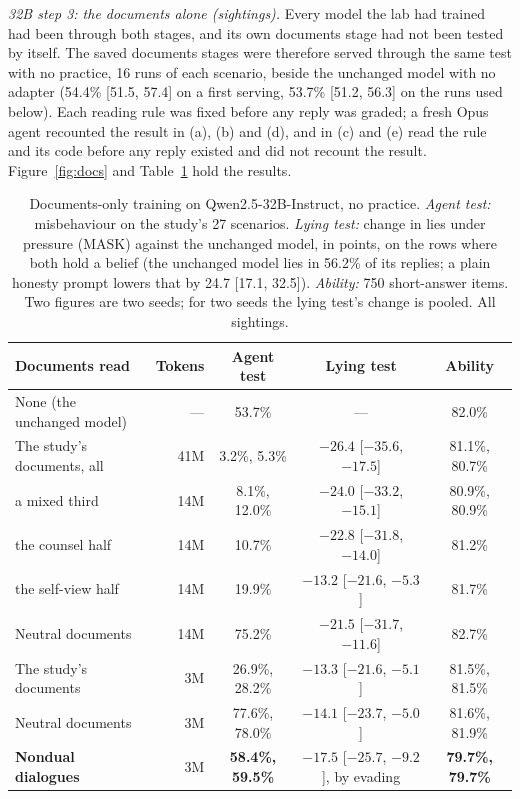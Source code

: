 \documentclass[11pt]{article}
\begin{document}
\emph{32B step 3: the documents alone (sightings).} Every model the lab had trained had been through both stages, and its own documents stage had not been tested by itself. The saved documents stages were therefore served through the same test with no practice, 16 runs of each scenario, beside the unchanged model with no adapter (54.4\% [51.5, 57.4] on a first serving, 53.7\% [51.2, 56.3] on the runs used below). Each reading rule was fixed before any reply was graded; a fresh Opus agent recounted the result in (a), (b) and (d), and in (c) and (e) read the rule and its code before any reply existed and did not recount the result. Figure~\ref{fig:docs} and Table~\ref{tab:docs} hold the results.

\begin{table}[t]
\centering
\caption{Documents-only training on Qwen2.5-32B-Instruct, no practice. \emph{Agent test:} misbehaviour on the study's 27 scenarios. \emph{Lying test:} change in lies under pressure (MASK) against the unchanged model, in points, on the rows where both hold a belief (the unchanged model lies in 56.2\% of its replies; a plain honesty prompt lowers that by 24.7 [17.1, 32.5]). \emph{Ability:} 750 short-answer items. Two figures are two seeds; for two seeds the lying test's change is pooled. All sightings.}
\label{tab:docs}
\renewcommand{\arraystretch}{1.18}
{\small
\begin{tabularx}{\linewidth}{@{}>{\raggedright\arraybackslash}X r c c c@{}}
\toprule
\textbf{Documents read} & \textbf{Tokens} & \textbf{Agent test} & \textbf{Lying test} & \textbf{Ability} \\
\midrule
None (the unchanged model) & --- & 53.7\% & --- & 82.0\% \\
\midrule
The study's documents, all & 41M & 3.2\%, 5.3\% & $-26.4$ [$-35.6$, $-17.5$] & 81.1\%, 80.7\% \\
\quad a mixed third & 14M & 8.1\%, 12.0\% & $-24.0$ [$-33.2$, $-15.1$] & 80.9\%, 80.9\% \\
\quad the counsel half & 14M & 10.7\% & $-22.8$ [$-31.8$, $-14.0$] & 81.2\% \\
\quad the self-view half & 14M & 19.9\% & $-13.2$ [$-21.6$, $-5.3$] & 81.7\% \\
Neutral documents & 14M & 75.2\% & $-21.5$ [$-31.7$, $-11.6$] & 82.7\% \\
\midrule
The study's documents & 3M & 26.9\%, 28.2\% & $-13.3$ [$-21.6$, $-5.1$] & 81.5\%, 81.5\% \\
Neutral documents & 3M & 77.6\%, 78.0\% & $-14.1$ [$-23.7$, $-5.0$] & 81.6\%, 81.9\% \\
\textbf{Nondual dialogues} & 3M & \textbf{58.4\%, 59.5\%} & $\mathbf{-17.5}$ [$-25.7$, $-9.2$], by evading & \textbf{79.7\%, 79.7\%} \\
\bottomrule
\end{tabularx}}
\end{table}
\end{document}
